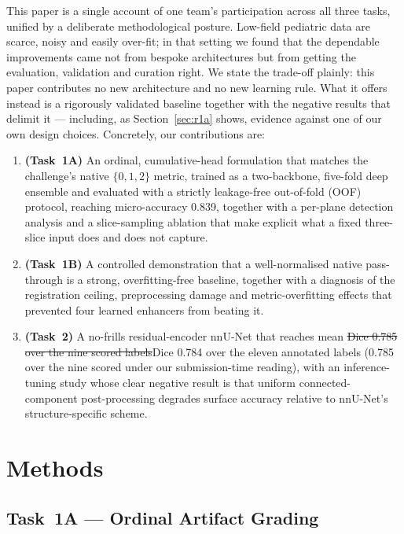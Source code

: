 \documentclass[runningheads]{llncs}
\newcommand{\addone}[1]{\textcolor{revone}{#1}}
\newcommand{\delone}[1]{\textcolor{revone}{\sout{#1}}}
\newcommand{\addboth}[1]{\textcolor{revboth}{#1}}
\begin{document}
This paper is a single account of one team's participation across all three
tasks, unified by a deliberate methodological posture. Low-field pediatric data
are scarce, noisy and easily over-fit; in that setting we found that the
dependable improvements came not from bespoke architectures but from getting the
evaluation, validation and curation right. \addone{We state the
trade-off plainly: this paper contributes no new architecture and no new learning
rule. What it offers instead is a rigorously validated baseline together with the
negative results that delimit it --- including, as Section~\ref{sec:r1a} shows,
evidence against one of our own design choices.} Concretely, our contributions are:
\begin{enumerate}
  \item \textbf{(Task~1A)} An ordinal, cumulative-head formulation that matches
        the challenge's native $\{0,1,2\}$ metric, trained as a two-backbone,
        five-fold deep ensemble and evaluated with a strictly leakage-free
        out-of-fold (OOF) protocol, reaching micro-accuracy 0.839\addboth{,
        together with a per-plane detection analysis and a slice-sampling ablation
        that make explicit what a fixed three-slice input does and does not capture}.
  \item \textbf{(Task~1B)} A controlled demonstration that a well-normalised
        native pass-through is a strong, overfitting-free baseline, together with
        a diagnosis of the registration ceiling, preprocessing damage and
        metric-overfitting effects that prevented four learned enhancers from
        beating it.
  \item \textbf{(Task~2)} A no-frills residual-encoder nnU-Net that reaches mean
        \delone{Dice 0.785 over the nine scored labels}\addone{Dice 0.784
        over the eleven annotated labels (0.785 over the nine scored under our
        submission-time reading)}, with an inference-tuning study
        whose clear negative result is that uniform connected-component
        post-processing degrades surface accuracy relative to nnU-Net's
        structure-specific scheme.
\end{enumerate}

\FloatBarrier
\section{Methods}
\label{sec:methods}

\subsection{Task~1A --- Ordinal Artifact Grading}
\label{sec:m1a}
\end{document}
